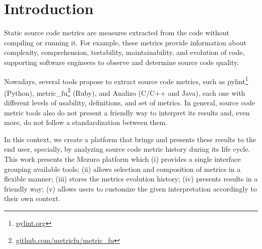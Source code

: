 \section{Introduction}
\label{sec:intro}

Static source code metrics are measures extracted from the code without
compiling or running it. For example, these metrics provide information about %
complexity, comprehension, testability, maintainability, and evolution of code,
supporting software engineers to observe and determine source code
quality\cite{mills1988}.

Nowadays, several tools propose to extract source code metrics, such as
pylint\footnote{\url{pylint.org}} (Python),
metric\_fu\footnote{\url{github.com/metricfu/metric_fu}} (Ruby), and Analizo
(C/C++ and Java)\cite{terceiro2010analizo}, each one with different levels of
usability, definitions, and set of metrics.
%
In general, source code metric tools also do not present a friendly way to
interpret its results and, even more, do not follow a standardization between
them.

In this context, we create a platform that brings and presents these results to %
the end user, specially, by analyzing source code metric history during its
life cycle.
This work presents the Mezuro platform which (i) provides a single interface
grouping available tools; (ii) allows selection and composition of metrics in a
flexible manner; (iii) stores the metrics evolution history; (iv) presents
results in a friendly way; (v) allows users to customize the given
interpretation accordingly to their own context.

